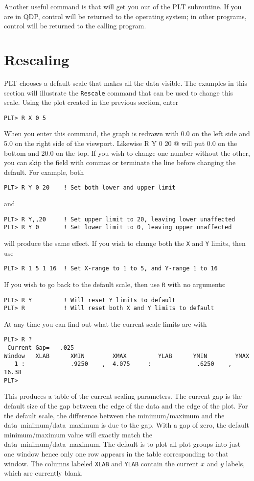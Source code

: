 Another useful command is \verb@EXit@ that will get you out of
the PLT subroutine.
If you are in QDP, control will be returned to the operating system;
in other programs, control will be returned to the calling program.

\section{Rescaling}

PLT chooses a default scale that makes all the data visible.
The examples in this section will illustrate
the {\tt Rescale} command that can be used to change this scale.
Using the plot created in the previous section, enter
\begin{verbatim}
PLT> R X 0 5
\end{verbatim}
When you enter this command, the graph is redrawn
with 0.0 on the left side and 5.0 on the right side of the viewport.
Likewise \verb@ R Y 0 20 @ will put 0.0 on the bottom and 20.0 on the top.
If you wish to change one number without the other,
you can skip the field with commas
or terminate the line before changing the default.
For example, both
\begin{verbatim}
PLT> R Y 0 20    ! Set both lower and upper limit
\end{verbatim}
and
\begin{verbatim}
PLT> R Y,,20     ! Set upper limit to 20, leaving lower unaffected
PLT> R Y 0       ! Set lower limit to 0, leaving upper unaffected
\end{verbatim}
will produce the same effect.
If you wish to change both the {\tt X} and {\tt Y} limits,
then use
\begin{verbatim}
PLT> R 1 5 1 16  ! Set X-range to 1 to 5, and Y-range 1 to 16
\end{verbatim}
If you wish to go back to the default scale, then use {\tt R} with
no arguments:
\begin{verbatim}
PLT> R Y         ! Will reset Y limits to default
PLT> R           ! Will reset both X and Y limits to default
\end{verbatim}

At any time you can find out what the current scale limits are with
\begin{verbatim}
PLT> R ?
 Current Gap=   .025
Window   XLAB      XMIN        XMAX         YLAB      YMIN        YMAX
   1 :             .9250    ,  4.075     :             .6250    ,  16.38
PLT>
\end{verbatim}
This produces a table of the current scaling parameters.
The current gap is the default size of the gap
between the edge of the data and the edge of the plot.
For the default scale, the difference between the minimum/maximum
and the data~minimum/data~maximum is due to the gap.
With a gap of zero, the default minimum/maximum value will
exactly match the data~minimum/data~maximum.
The default is to plot all plot groups into just one window
hence only one row appears in the table corresponding to that window.
The columns labeled {\tt XLAB} and {\tt YLAB} contain the
current $x$ and $y$ labels, which are currently blank.

